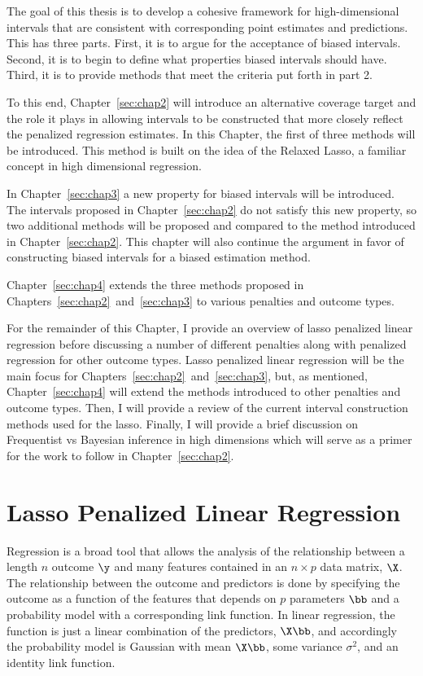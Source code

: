 The goal of this thesis is to develop a cohesive framework for high-dimensional intervals that are consistent with corresponding point estimates and predictions. This has three parts. First, it is to argue for the acceptance of biased intervals. Second, it is to begin to define what properties biased intervals should have. Third, it is to provide methods that meet the criteria put forth in part 2. 

To this end, Chapter~\ref{sec:chap2} will introduce an alternative coverage target and the role it plays in allowing intervals to be constructed that more closely reflect the penalized regression estimates. In this Chapter, the first of three methods will be introduced. This method is built on the idea of the Relaxed Lasso, a familiar concept in high dimensional regression.

In Chapter~\ref{sec:chap3} a new property for biased intervals will be introduced. The intervals proposed in Chapter~\ref{sec:chap2} do not satisfy this new property, so two additional methods will be proposed and compared to the method introduced in Chapter~\ref{sec:chap2}. This chapter will also continue the argument in favor of constructing biased intervals for a biased estimation method.

Chapter~\ref{sec:chap4} extends the three methods proposed in Chapters~\ref{sec:chap2}~and~\ref{sec:chap3} to various penalties and outcome types. 

For the remainder of this Chapter, I provide an overview of lasso penalized linear regression before discussing a number of different penalties along with penalized regression for other outcome types. Lasso penalized linear regression will be the main focus for Chapters~\ref{sec:chap2}~and~\ref{sec:chap3}, but, as mentioned, Chapter~\ref{sec:chap4} will extend the methods introduced to other penalties and outcome types. Then, I will provide a review of the current interval construction methods used for the lasso. Finally, I will provide a brief discussion on Frequentist vs Bayesian inference in high dimensions which will serve as a primer for the work to follow in Chapter~\ref{sec:chap2}.

\section{Lasso Penalized Linear Regression}

Regression is a broad tool that allows the analysis of the relationship between a length $n$ outcome $\y$ and many features contained in an $n \times p$ data matrix, $\X$. The relationship between the outcome and predictors is done by specifying the outcome as a function of the features that depends on $p$ parameters $\bb$ and a probability model with a corresponding link function. In linear regression, the function is just a linear combination of the predictors, $\X\bb$, and accordingly the probability model is Gaussian with mean $\X\bb$, some variance $\sigma^2$, and an identity link function. 

